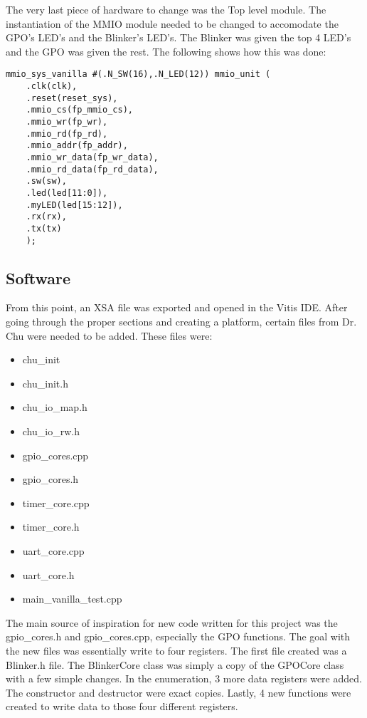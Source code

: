 \documentclass[11pt]{article}
\begin{document}
\quad The very last piece of hardware to change was the Top level module. The instantiation of the MMIO module needed to be changed to accomodate the GPO's LED's and the Blinker's LED's. The Blinker was given the top 4 LED's and the GPO was given the rest. The following shows how this was done: 

\begin{lstlisting}[style=Verilog,caption=MMIO Instantiation with changes,label=code:ex ]
mmio_sys_vanilla #(.N_SW(16),.N_LED(12)) mmio_unit (
	.clk(clk),
	.reset(reset_sys),
	.mmio_cs(fp_mmio_cs),
	.mmio_wr(fp_wr),
	.mmio_rd(fp_rd),
	.mmio_addr(fp_addr), 
	.mmio_wr_data(fp_wr_data),
	.mmio_rd_data(fp_rd_data),
	.sw(sw),
	.led(led[11:0]),
	.myLED(led[15:12]),
	.rx(rx),
	.tx(tx)          
	); 
\end{lstlisting}

\subsection{Software}
\quad From this point, an XSA file was exported and opened in the Vitis IDE. After going through the proper sections and creating a platform, certain files from Dr. Chu were needed to be added. These files were: 

\begin{multicols}{2}
	\begin{itemize}
		\item chu\_init
		\item chu\_init.h
		\item chu\_io\_map.h
		\item chu\_io\_rw.h
		\item gpio\_cores.cpp
		\item gpio\_cores.h
		\item timer\_core.cpp
		\item timer\_core.h
		\item uart\_core.cpp
		\item uart\_core.h
		\item main\_vanilla\_test.cpp		
	\end{itemize}
\end{multicols}

\quad The main source of inspiration for new code written for this project was the gpio\_cores.h and gpio\_cores.cpp, especially the GPO functions. The goal with the new files was essentially write to four registers. The first file created was a Blinker.h file. The BlinkerCore class was simply a copy of the GPOCore class with a few simple changes. In the enumeration, 3 more data registers were added. The constructor and destructor were exact copies. Lastly, 4 new functions were created to write data to those four different registers. 
\end{document}

